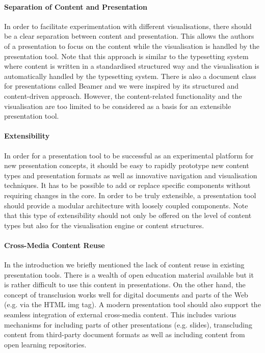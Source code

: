      \paragraph{Separation of Content and Presentation} In order to facilitate
      experimentation with different visualisations, there should be a clear
      separation between content and presentation. This allows the authors of a
      presentation to focus on the content while the visualisation is handled
      by the presentation tool. Note that this approach is similar to the
      \latex typesetting system where content is written in a standardised
      structured way and the visualisation is automatically handled by the
      typesetting system. There is also a \latex document class for
      presentations called Beamer and we were inspired by its structured and
      content-driven approach. However, the content-related functionality and
      the visualisation are too limited to be considered as a basis for an
      extensible presentation tool.

     \paragraph{Extensibility} In order for a presentation tool to be
      successful as an experimental platform for new presentation concepts, it
      should be easy to rapidly prototype new content types and presentation
      formats as well as innovative navigation and visualisation techniques. It
      has to be possible to add or replace specific components without
      requiring changes in the core. In order to be truly extensible, a
      presentation tool should provide a modular architecture with loosely
      coupled components. Note that this type of extensibility should not only
      be offered on the level of content types but also for the visualisation
      engine or content structures.

     \paragraph{Cross-Media Content Reuse} In the introduction we briefly
      mentioned the lack of content reuse in existing presentation tools. There
      is a wealth of open education material available but it is rather
      difficult to use this content in presentations. On the other hand, the
      concept of transclusion works well for digital documents and parts of the
      Web (e.g. via the HTML img tag). A modern presentation tool should also
      support the seamless integration of external cross-media content. This
      includes various mechanisms for including parts of other presentations
      (e.g. slides), transcluding content from third-party document formats as
      well as including content from open learning repositories.


